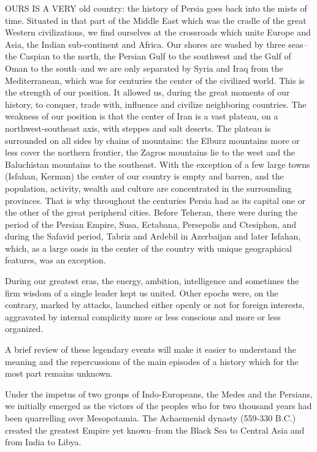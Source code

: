 
OURS IS A VERY old country: the history of Persia goes back into the mists of time. Situated in that part of the Middle East which was the cradle of the great Western civilizations, we find ourselves at the crossroads which unite Europe and Asia, the Indian sub-continent and Africa. Our shores are washed by three seas--the Caspian to the north, the Persian Gulf to the southwest and the Gulf of Oman to the south--and we are only separated by Syria and Iraq from the Mediterranean, which was for centuries the center of the civilized world. This is the strength of our position. It allowed us, during the great moments of our history, to conquer, trade with, influence and civilize neighboring countries. The weakness of our position is that the center of Iran is a vast plateau, on a northwest-southeast axis, with steppes and salt deserts. The plateau is surrounded on all sides by chains of mountains: the Elburz mountains more or less cover the northern frontier, the Zagros mountains lie to the west and the Baluchistan mountains to the southeast. With the exception of a few large towns (Isfahan, Kerman) the center of our country is empty and barren, and the population, activity, wealth and culture are concentrated in the surrounding provinces. That is why throughout the centuries Persia had as its capital one or the other of the great peripheral cities. Before Teheran, there were during the period of the Persian Empire, Susa, Ectabana, Persepolis and Ctesiphon, and during the Safavid period, Tabriz and Ardebil in Azerbaijan and later Isfahan, which, as a large oasis in the center of the country with unique geographical features, was an exception. 

During our greatest eras, the energy, ambition, intelligence and sometimes the firm wisdom of a single leader kept us united. Other epochs were, on the contrary, marked by attacks, launched either openly or not for foreign interests, aggravated by internal complicity more or less conscious and more or less organized. 

A brief review of these legendary events will make it easier to understand the meaning and the repercussions of the main episodes of a history which for the most part remains unknown. 


Under the impetus of two groups of Indo-Europeans, the Medes and the Persians, we initially emerged as the victors of the peoples who for two thousand years had been quarrelling over Mesopotamia. The Achaemenid dynasty (559-330 B.C.) created the greatest Empire yet known--from the Black Sea to Central Asia and from India to Libya. 


